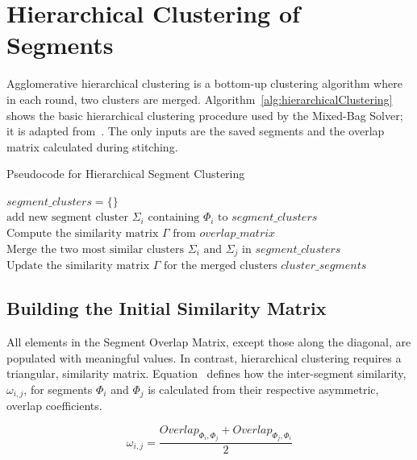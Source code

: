 \section{Hierarchical Clustering of Segments}\label{sec:hierarchicalClustering}

Agglomerative hierarchical clustering is a bottom-up clustering algorithm where in each round, two clusters are merged.  Algorithm~\ref{alg:hierarchicalClustering} shows the basic hierarchical clustering procedure used by the Mixed-Bag Solver; it is adapted from~\cite{tanIntroToDataMining}.  The only inputs are the saved segments and the overlap matrix calculated during stitching.

\begin{algorithm}[t]
\caption{Pseudocode for Hierarchical Segment Clustering}\label{alg:hierarchicalClustering}
\begin{algorithmic}[1]
	\State $\textit{segment\_clusters} = \{ \}$	
		\State $\text{add new segment cluster } \Sigma_i \text{ containing } \Phi_i \text{ to } segment\_clusters$
	\EndFor
    \State $\text{Compute the similarity matrix } \Gamma \text{ from } overlap\_matrix$
    	\State $\text{Merge the two most similar clusters } \Sigma_i \text{ and } \Sigma_j \text{ in } \textit{segment\_clusters}$
    	\State $\text{Update the similarity matrix } \Gamma \text{ for the merged clusters}$
	\EndWhile
    \State \Return $\textit{cluster\_segments}$
\EndFunction
\end{algorithmic}
\end{algorithm}

\subsection{Building the Initial Similarity Matrix}\label{sec:quantifyingSegmentSimilarity}

All elements in the Segment Overlap Matrix, except those along the diagonal, are populated with meaningful values.  In contrast, hierarchical clustering requires a triangular, similarity matrix.  Equation~ defines how the inter-segment similarity, $\omega_{i,j}$, for segments $\Phi_i$ and $\Phi_j$ is calculated from their respective asymmetric, overlap coefficients.

\begin{equation} \label{eq:segmentSimilarity}
\omega_{i,j} = \frac{Overlap_{\Phi_i, \Phi_j} + Overlap_{\Phi_j, \Phi_i}}{2} 
\end{equation}

